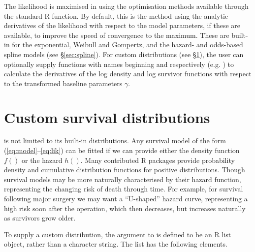 \documentclass[nojss,nofooter]{jss}
\begin{document}
The likelihood is maximised in  using the
optimisation methods available through the standard R 
function.  By default, this is the  method \citep{nash}
using the analytic derivatives of the likelihood with respect to the
model parameters, if these are available, to improve the speed of
convergence to the maximum.  These are built-in for the exponential,
Weibull and Gompertz, and the hazard- and odds-based spline models
(see \S\ref{sec:spline}).  For custom distributions (see
\S\ref{sec:custom}), the user can optionally supply functions with
names beginning  and  respectively
(e.g. ) to calculate the derivatives of
the log density and log survivor functions with respect to the
transformed baseline parameters $\gamma$.


\section{Custom survival distributions}
\label{sec:custom}

 is not limited to its built-in distributions.  Any
survival model of the form (\ref{eq:model}--\ref{eq:lik}) can be
fitted if we can provide either the density function $f()$ or the
hazard $h()$.  Many contributed R packages provide probability density
and cumulative distribution functions for positive distributions.  
Though survival models may be more naturally characterised by their
hazard function, representing the changing risk of death through time.
For example, for survival following major surgery we may want a
``U-shaped'' hazard curve, representing a high risk soon after the
operation, which then decreases, but increases naturally as survivors
grow older.

To supply a custom distribution, the  argument to
 is defined to be an R list object, rather than a
character string.  The list has the following elements.
\end{document}
